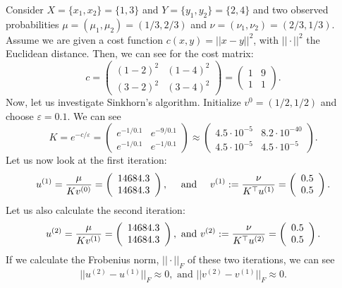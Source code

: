 \vspace{0.3cm}
\begin{example}
	Consider $X = \{x_1, x_2\} = \{1, 3\}$ and $Y = \{y_1, y_2\} = \{2, 4\}$ and two observed probabilities $\mu = (\mu_1, \mu_2) = (1/3, 2/3)$ and $\nu = (\nu_1, \nu_2)= (2/3, 1/3)$. Assume we are given a cost function $c(x,y) = ||x-y||^2$, with $||\cdot||^2$ the Euclidean distance. Then, we can see for the cost matrix:
	\[c = \left(\begin{array}{cc}
		(1-2)^2 & (1-4)^2 \\ 
		(3-2)^2 & (3-4)^2
	\end{array}\right) = \left(\begin{array}{cc}
		1 & 9 \\ 
		1 & 1
	\end{array}\right). \]
	Now, let us investigate Sinkhorn's algorithm. Initialize $v^{0} = (1/2, 1/2)$ and choose $\varepsilon = 0.1$. We can see 
	\[K = e^{-c/\varepsilon} = \left(\begin{array}{cc}
		e^{-1/0.1} & e^{-9/0.1} \\ 
		e^{-1/0.1} & e^{-1/0.1}
	\end{array}\right) \approx \left(\begin{array}{cc}
		4.5 \cdot 10^{-5} & 8.2\cdot 10^{-40} \\ 
		4.5 \cdot 10^{-5} & 4.5 \cdot 10^{-5}
	\end{array}\right).  \]  
	Let us now look at the first iteration: 
	\[u^{(1)} = \frac{\mu}{Kv^{(0)}} = \left(\begin{array}{c}
		14684.3 \\ 14684.3 
	\end{array}\right), \quad \text{ and }\quad v^{(1)} := \frac{\nu}{K^\top u^{(1)}} = \left(\begin{array}{c}
		0.5 \\ 0.5
	\end{array}\right). \]
	Let us also calculate the second iteration: 
	\[u^{(2)} = \frac{\mu}{Kv^{(1)}} = \left(\begin{array}{c}
		14684.3 \\ 14684.3 
	\end{array}\right), \text{ and } v^{(2)} := \frac{\nu}{K^\top u^{(2)}} = \left(\begin{array}{c}
		0.5 \\ 0.5
	\end{array}\right). \]
	If we calculate the Frobenius norm, $||\cdot||_F$ of these two iterations, we can see 
	\[ ||u^{(2)} - u^{(1)}||_F \approx 0, \text{ and } ||v^{(2)} - v^{(1)}||_F \approx 0. \]

\end{example}

